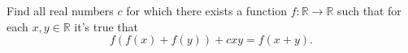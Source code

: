 Find all real numbers $c$ for which there exists a function $f\colon\mathbb R\rightarrow \mathbb R$ such that for each $x, y\in\mathbb R$ it's true that
$$f(f(x)+f(y))+cxy=f(x+y).$$